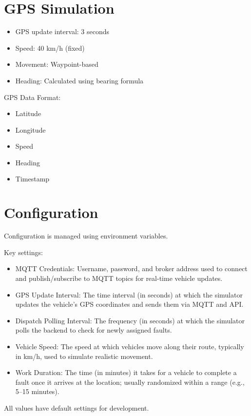 \section{GPS Simulation}
\begin{itemize}
    \item GPS update interval: 3 seconds
    \item Speed: 40 km/h (fixed)
    \item Movement: Waypoint-based
    \item Heading: Calculated using bearing formula
\end{itemize}

GPS Data Format:
\begin{itemize}
    \item Latitude
    \item Longitude
    \item Speed
    \item Heading
    \item Timestamp
\end{itemize}

\section{Configuration}
Configuration is managed using environment variables.

Key settings:
\begin{itemize}
    \item MQTT Credentials: Username, password, and broker address used to connect and publish/subscribe to MQTT topics for real-time vehicle updates.
    \item GPS Update Interval: The time interval (in seconds) at which the simulator updates the vehicle’s GPS coordinates and sends them via MQTT and API.
    \item Dispatch Polling Interval: The frequency (in seconds) at which the simulator polls the backend to check for newly assigned faults.
    \item Vehicle Speed: The speed at which vehicles move along their route, typically in km/h, used to simulate realistic movement.
    \item Work Duration: The time (in minutes) it takes for a vehicle to complete a fault once it arrives at the location; usually randomized within a range (e.g., 5–15 minutes).
\end{itemize}

All values have default settings for development.

